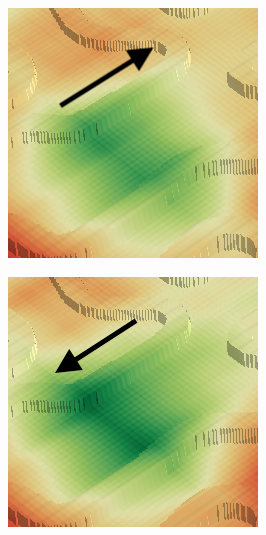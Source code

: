 \documentclass[../document.tex]{subfiles}
\begin{document}
\begin{figure} [htbp]
  \centering
  \begin{subfigure}[b]{0.23\textwidth}
    \includegraphics[width=\linewidth]{../img/4/traversability/bars/tunnel/-270-crop.png} 
  \end{subfigure}
  \begin{subfigure}[b]{0.23\textwidth}
      \includegraphics[width=\linewidth]{../img/4/traversability/bars/tunnel/-90-crop.png}

\end{subfigure}
\end{figure}
\end{document}
